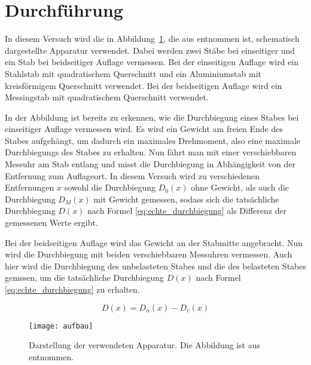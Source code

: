 \section{Durchführung}

In diesem Versuch wird die in Abbildung~\ref{fig:aufbau}, die aus
\textcite{v103} entnommen ist, schematisch dargestellte Apparatur
verwendet.  Dabei werden zwei Stäbe bei einseitiger und ein Stab bei
beidseitiger Auflage vermessen.  Bei der einseitigen Auflage wird ein
Stahlstab mit quadratischem Querschnitt und ein Aluminiumstab mit
kreisförmigem Querschnitt verwendet. Bei der beidseitigen Auflage wird
ein Messingstab mit quadratischem Querschnitt verwendet.

In der Abbildung ist bereits zu erkennen, wie die Durchbiegung eines
Stabes bei einseitiger Auflage vermessen wird. Es wird ein Gewicht am
freien Ende des Stabes aufgehängt, um dadurch ein maximales Drehmoment,
also eine maximale Durchbiegungs des Stabes zu erhalten. Nun fährt man
mit einer verschiebbaren Messuhr am Stab entlang und misst die
Durchbiegung in Abhängigkeit von der Entfernung zum Auflageort. In
diesem Versuch wird zu verschiedenen Entfernungen $x$ sowohl die
Durchbiegung $D_0(x)$ ohne Gewicht, als auch die Durchbiegung $D_M(x)$
mit Gewicht gemessen, sodass sich die tatsächliche Durchbiegung $D(x)$
nach Formel \eqref{eq:echte_durchbiegung} als Differenz der gemessenen
Werte ergibt.

Bei der beidseitigen Auflage wird das Gewicht an der Stabmitte
angebracht. Nun wird die Durchbiegung mit beiden verschiebbaren
Messuhren vermessen. Auch hier wird die Durchbiegung des unbelasteten
Stabes und die des belasteten Stabes gemssen, um die tatsächliche
Durchbiegung $D(x)$ nach Formel \eqref{eq:echte_durchbiegung} zu
erhalten.

\begin{equation}
\label{eq:echte_durchbiegung}
D(x) = D_n(x) - D_v(x)
\end{equation}

\begin{figure}
  \centering
  \texttt{[image: aufbau]}
  \caption{Darstellung der verwendeten Apparatur. Die Abbildung ist aus
    \textcite{v103} entnommen.}
  \label{fig:aufbau}
\end{figure} 
